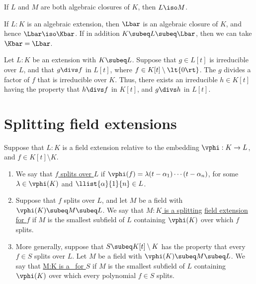 \documentclass{article}
\begin{document}
  \begin{tproposition}
    If \( L \) and \( M \) are both algebraic closures of \( K \), then \( L \iso M \).
  \end{tproposition}

  \begin{tproposition}
    If \( L:K \) is an algebraic extension, then \( \Lbar \) is an algebraic closure of \( K \), and hence \( \Lbar\iso\Kbar \).
    If in addition \( K\subeq L\subeq \Lbar \), then we can take \( \Kbar = \Lbar \).
  \end{tproposition}

  \begin{tproposition}
    Let \( L:K \) be an extension with \( K\subeq L \).
    Suppose that \( g\in L[t] \) is irreducible over \( L \), and that \( g\divs f \) in \( L[t] \), where \( f\in K[t]\setminus \lt\{ 0 \rt\} \).
    The \( g \) divides a factor of \( f \) that is irreducible over \( K \).
    Thus, there exists an irreducible \( h\in K[t] \) having the property that \( h\divs f \) in \( K[t] \), and \( g\divs h \) in \( L[t] \).
  \end{tproposition}

\section{Splitting field extensions}
  \begin{tdefinition}
    Suppose that \( L:K \) is a field extension relative to the embedding \( \vphi : K\to L \), and \( f\in K[t]\setminus K \).
    \begin{enumerate}[label=(\roman*)]
      \item We say that \ul{\( f \) splits over \( L \)} if \( \vphi(f)=\lambda(t-\alpha_1)\cdots(t-\alpha_n) \), for some \( \lambda\in \vphi(K) \) and \( \llist{\alpha}{1}{n}\in L \).
      \item Suppose that \( f \) splits over \( L \), and let \( M \) be a field with \( \vphi(K)\subeq M\subeq L \).
        We say that \ul{\( M:K \) is a splitting} \ul{field extension for \( f \)} if \( M \) is the smallest subfield of \( L \) containing \( \vphi(K) \) over which \( f \) splits.
      \item More generally, suppose that \( S\subeq K[t]\setminus K \) has the property that every \( f\in S \) splits over \( L \).
        Let \( M \) be a field with \( \vphi(K)\subeq M\subeq L \).
        We say that \ul{M:K is a \sfe~for \( S \)} if \( M \) is the smallest subfield of \( L \) containing \( \vphi(K) \) over which every polynomial \( f\in S \) splits.
    \end{enumerate}
  \end{tdefinition}
\end{document}
